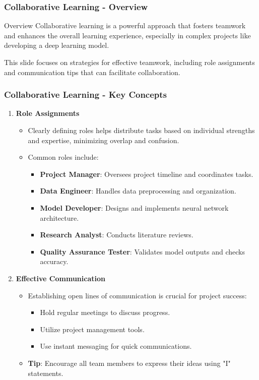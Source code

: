 \documentclass[aspectratio=169]{beamer}
\begin{document}
\begin{frame}[fragile]
    \frametitle{Collaborative Learning - Overview}
    \begin{block}{Overview}
        Collaborative learning is a powerful approach that fosters teamwork and enhances the overall learning experience, especially in complex projects like developing a deep learning model. 
    \end{block}
    This slide focuses on strategies for effective teamwork, including role assignments and communication tips that can facilitate collaboration.
\end{frame}

\begin{frame}[fragile]
    \frametitle{Collaborative Learning - Key Concepts}
    \begin{enumerate}
        \item \textbf{Role Assignments}
        \begin{itemize}
            \item Clearly defining roles helps distribute tasks based on individual strengths and expertise, minimizing overlap and confusion.
            \item Common roles include:
            \begin{itemize}
                \item \textbf{Project Manager}: Oversees project timeline and coordinates tasks.
                \item \textbf{Data Engineer}: Handles data preprocessing and organization.
                \item \textbf{Model Developer}: Designs and implements neural network architecture.
                \item \textbf{Research Analyst}: Conducts literature reviews.
                \item \textbf{Quality Assurance Tester}: Validates model outputs and checks accuracy.
            \end{itemize}
        \end{itemize}
        \item \textbf{Effective Communication}
        \begin{itemize}
            \item Establishing open lines of communication is crucial for project success:
            \begin{itemize}
                \item Hold regular meetings to discuss progress.
                \item Utilize project management tools.
                \item Use instant messaging for quick communications.
            \end{itemize}
            \item \textbf{Tip}: Encourage all team members to express their ideas using "I" statements.
        \end{itemize}
    \end{enumerate}
\end{frame}
\end{document}
